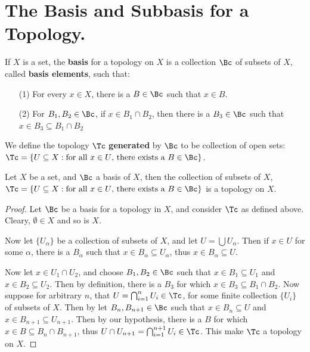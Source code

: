 
\section{The Basis and Subbasis for a Topology.}

\begin{definition}
    If $X$ is a set, the \textbf{basis} for a topology on $X$ is a collection $\Bc$ of
    subsets of  $X$, called \textbf{basis elements}, such that:
        \begin{enumerate}
            \item[(1)] For every $x \in X$, there is a  $B \in \Bc$ such that $x \in B$.

            \item[(2)] For $B_1,B_2 \in \Bc$, if $x \in B_1 \cap B_2$, then there is a
                $B_3 \in \Bc$ such that $x \in B_3 \subseteq B_1 \cap B_2$
        \end{enumerate}
We define the topology $\Tc$ \textbf{generated} by $\Bc$ to be collection of open sets:
$\Tc=\{U \subseteq X: \text{for all } x \in U \text{, there exists a } B \in \Bc\}$.
\end{definition}

\begin{theorem}\label{1.2.1}
    Let $X$ be a set, and  $\Bc$ a basis of  $X$, then the collection of subsets
    of  $X$, $\Tc=\{U \subseteq X: \text{for all } x \in U \text{, there exists
    a } B \in \Bc\}$ is a topology on $X$.
\end{theorem}
\begin{proof}
    Let $\Bc$ be a basis for a topology in  $X$, and consider  $\Tc$ as defined
    above. Cleary, $\emptyset \in X$ and so is  $X$.

    Now let  $\{U_{\alpha}\}$ be a collection of subsets of  $X$, and let
    $U=\bigcup{U_{\alpha}}$. Then if  $x \in U$ for some  $\alpha$, there is a
    $B_{\alpha}$ such that  $x \in B_{\alpha} \subseteq U_{\alpha}$, thus  $x \in
    B_{\alpha} \subseteq U$.

    Now let  $x \in  U_1 \cap U_2$, and choose $B_1,B_2 \in \Bc$ such that $x \in B_1 \subseteq U_1$
    and $x \in B_2 \subseteq U_2$. Then  by definition, there is a $B_3$ for which $x \in B_3 \subseteq B_1 \cap B_2$.
    Now suppose for arbitrary $n$, that  $U=\bigcap_{i=1}^{n}{U_i} \in \Tc$, for some finite
    collection  $\{U_i\}$ of subsets of  $X$. Then by let  $B_n, B_{n+1} \in \Bc$ such that
    $x \in B_n \subseteq U$ and  $x \in B_{n+1} \subseteq U_{n+1}$. Then by our hypothesis, there is a  $B$
for which  $x \in B \subseteq B_n \cap B_{n+1}$, thus  $U \cap U_{n+1}=\bigcap_{i=1}^{n+1}{U_i} \in \Tc$.
This make $\Tc$ a topology on  $X$.
\end{proof}

